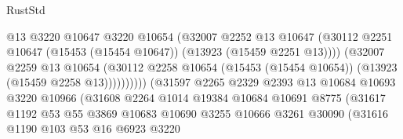 \begin{lexlean}{RustStd}
\begin{coremodule}
                                          @13
                                          @3220
                                          @10647
                                          @3220
                                          @10654
                                          (@32007
                                            @2252
                                            @13
                                            @10647
                                            (@30112
                                              @2251
                                              @10647
                                              (@15453 (@15454 @10647))
                                              (@13923 (@15459 @2251 @13))))
                                          (@32007
                                            @2259
                                            @13
                                            @10654
                                            (@30112
                                              @2258
                                              @10654
                                              (@15453 (@15454 @10654))
                                              (@13923 (@15459 @2258 @13))))))))))
                              (@31597
                                @2265
                                @2329
                                @2393
                                @13
                                @10684
                                @10693
                                @3220
                                @10966
                                (@31608
                                  @2264
                                  @1014
                                  @19384
                                  @10684
                                  @10691
                                  @8775
                                  (@31617
                                    @1192
                                    @53
                                    @55
                                    @3869
                                    @10683
                                    @10690
                                    @3255
                                    @10666
                                    @3261
                                    @30090
                                    (@31616
                                      @1190
                                      @103
                                      @53
                                      @16
                                      @6923
                                      @3220

\end{coremodule}
\end{lexlean}
